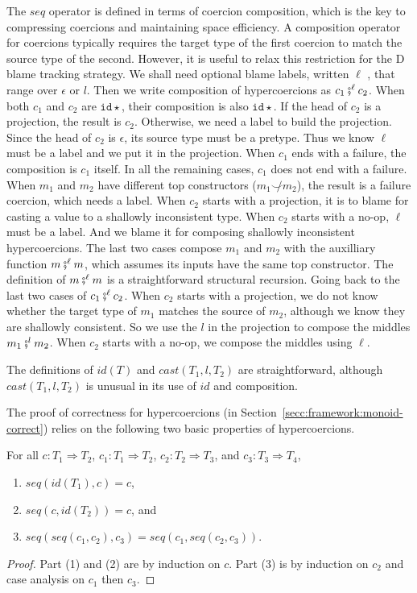 \documentclass[acmsmall,review,anonymous]{acmart}\settopmatter{printfolios=true,printccs=false,printacmref=false}
\newcommand{\lazyD}{Lazy\;D}
\newcommand{\hyperCoercionI}[0]{\mathtt{id\star}}
\begin{document}
The $seq$ operator is defined in terms of coercion composition, which
is the key to compressing coercions and maintaining space efficiency.
A composition operator for coercions typically requires the target
type of the first coercion to match the source type of the second.
However, it is useful to relax this restriction for the D blame
tracking strategy.
%
We shall need optional blame labels, written $\ell$ , that range over
$\epsilon$ or $l$. Then we write composition of hypercoercions as $c_1
\fatsemi^\ell c_2$.  When both $c_1$ and $c_2$ are $\hyperCoercionI$,
their composition is also $\hyperCoercionI$.  If the head of $c_2$ is
a projection, the result is $c_2$.  Otherwise, we need a label to
build the projection. Since the head of $c_2$ is $\epsilon$, its
source type must be a pretype. Thus we know $\ell$ must be a label and
we put it in the projection. When $c_1$ ends with a failure, the
composition is $c_1$ itself. In all the remaining cases, $c_1$ does
not end with a failure.  When $m_1$ and $m_2$ have different top
constructors ($m_1 \not\smile m_2$), the result is a failure coercion,
which needs a label. When $c_2$ starts with a projection, it is to
blame for casting a value to a shallowly inconsistent type. When $c_2$
starts with a no-op, $\ell$ must be a label. And we blame it for
composing shallowly inconsistent hypercoercions. The last two cases
compose $m_1$ and $m_2$ with the auxilliary function $m \fatsemi^\ell
m$, which assumes its inputs have the same top constructor. The
definition of $m \fatsemi^\ell m$ is a straightforward structural
recursion. Going back to the last two cases of $c_1 \fatsemi^\ell
c_2$. When $c_2$ starts with a projection, we do not know whether the
target type of $m_1$ matches the source of $m_2$, although we know
they are shallowly consistent. So we use the $l$ in the projection to
compose the middles $m_1 \fatsemi^l m_2$. When $c_2$ starts with a
no-op, we compose the middles using $\ell$.

The definitions of $id(T)$ and $cast(T_1,l,T_2)$ are straightforward,
although $cast(T_1,l,T_2)$ is unusual in its use of $id$ and
composition.

The proof of correctness for hypercoercions (in
Section~\ref{secc:framework:monoid-correct}) relies on the following
two basic properties of hypercoercions.

\begin{proposition}[\lazyD{} hypercoercions form a monoid]
  \label{thm:hc-monoid}
  For all $c : T_1 \Longrightarrow T_2$,
  $c_1 : T_1 \Longrightarrow T_2$,
  $c_2 : T_2 \Longrightarrow T_3$, and
  $c_3 : T_3 \Longrightarrow T_4$,
  \begin{enumerate}
    \item $seq(id(T_1),c) = c$,
    \item $seq(c,id(T_2)) = c$, and
    \item $seq(seq(c_1, c_2), c_3) = seq(c_1, seq(c_2, c_3))$.
  \end{enumerate}
\end{proposition}
\begin{proof}
  Part (1) and (2) are by induction on $c$. Part (3) is by induction
  on $c_2$ and case analysis on $c_1$ then $c_3$.
\end{proof}
\end{document}
